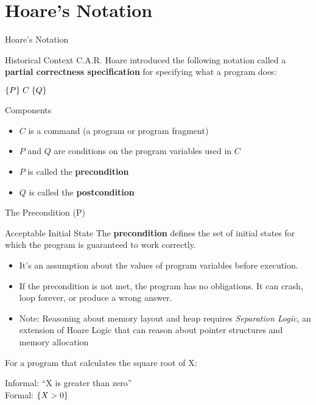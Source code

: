\section{Hoare's Notation}

\begin{frame}{Hoare's Notation}
    \begin{block}{Historical Context}
        C.A.R. Hoare introduced the following notation called a \textbf{partial correctness specification} for specifying what a program does:
        \begin{center}
            \Large $\{P\}\; C\; \{Q\}$
        \end{center}
    \end{block}
    
    \begin{block}{Components}
        \begin{itemize}
            \item $C$ is a command (a program or program fragment)
            \item $P$ and $Q$ are conditions on the program variables used in $C$
            \item $P$ is called the \textbf{precondition}
            \item $Q$ is called the \textbf{postcondition}
        \end{itemize}
    \end{block}
\end{frame}

\begin{frame}{The Precondition (P)}
    \begin{block}{Acceptable Initial State}
        The \textbf{precondition} defines the set of initial states for which the program is guaranteed to work correctly.
        \begin{itemize}
            \item It's an assumption about the values of program variables before execution.
            \item If the precondition is not met, the program has no obligations. It can crash, loop forever, or produce a wrong answer.
            \item Note: Reasoning about memory layout and heap requires \emph{Separation Logic}, an extension of Hoare Logic that can reason about pointer structures and memory allocation
        \end{itemize}
    \end{block}

    \begin{example}
        For a program that calculates the square root of X:
        \begin{center}
            Informal: ``X is greater than zero''\\
            Formal: $\{X > 0\}$
        \end{center}
    \end{example}
\end{frame}


